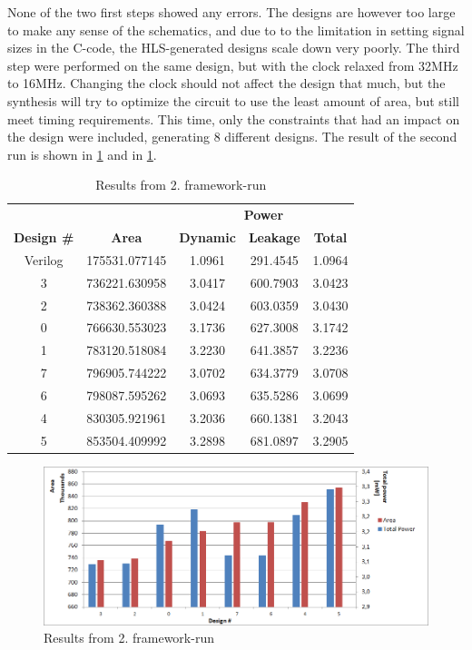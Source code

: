 None of the two first steps showed any errors. The designs are however too large to make any sense of the schematics, and due to to the limitation in setting signal sizes in the C-code, the HLS-generated designs scale down very poorly. The third step were performed on the same design, but with the clock relaxed from 32MHz to 16MHz. Changing the clock should not affect the design that much, but the synthesis will try to optimize the circuit to use the least amount of area, but still meet timing requirements. This time, only the constraints that had an impact on the design were included, generating 8 different designs. The result of the second run is shown in \cref{tab:resultgraphframeworkrun2} and in \cref{fig:resultgraphframeworkrun2}.
\begin{table}[hbtp]
    \centering
    \begin{tabular}{ccccc}
    & & \multicolumn{3}{c}{\textbf{Power}} \\
    \cline{3-5}
    \textbf{Design \#} & \textbf{Area} & \textbf{Dynamic} & \textbf{Leakage} & \textbf{Total} \\
    \toprule
    Verilog & 175531.077145 & 1.0961 & 291.4545 & 1.0964 \\
    3 & 736221.630958 & 3.0417 & 600.7903 & 3.0423 \\
    2 & 738362.360388 & 3.0424 & 603.0359 & 3.0430 \\
    0 & 766630.553023 & 3.1736 & 627.3008 & 3.1742 \\
    1 & 783120.518084 & 3.2230 & 641.3857 & 3.2236 \\
    7 & 796905.744222 & 3.0702 & 634.3779 & 3.0708 \\
    6 & 798087.595262 & 3.0693 & 635.5286 & 3.0699 \\
    4 & 830305.921961 & 3.2036 & 660.1381 & 3.2043 \\
    5 & 853504.409992 & 3.2898 & 681.0897 & 3.2905 \\

    \bottomrule
    \end{tabular}
    \caption{Results from 2. framework-run}
    \label{tab:resultgraphframeworkrun2}
\end{table}

\begin{figure}[hbpt]
\centering
\includegraphics[width=\textwidth]{../figs/resultGraph2.png}
\caption{\label{fig:resultgraphframeworkrun2}Results from 2. framework-run}
\end{figure}

